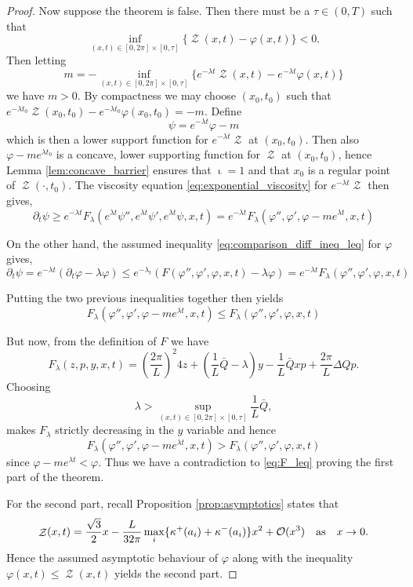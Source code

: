 \documentclass[11pt]{amsart}
\DeclareMathOperator{\chordarcprofile}{\mathcal{Z}}
\DeclareMathOperator{\tangindicator}{\iota}
\begin{document}
\begin{proof}
Now suppose the theorem is false. Then there must be a $\tau \in (0, T)$ such that
\[
\inf_{(x, t) \in [0, 2\pi] \times [0,\tau]} \{\chordarcprofile(x, t) - \varphi(x, t)\}  < 0.
\]
Then letting
\[
m = -\inf_{(x, t) \in [0, 2\pi] \times [0,\tau]} \{e^{-\lambda t} \chordarcprofile(x, t) - e^{-\lambda t} \varphi(x, t)\}
\]
we have $m > 0$. By compactness we may choose $(x_0, t_0)$ such that $e^{-\lambda t_0} \chordarcprofile(x_0, t_0) - e^{-\lambda t_0} \varphi(x_0, t_0) = -m$. Define
\[
\psi = e^{-\lambda t} \varphi - m
\]
which is then a lower support function for $e^{-\lambda t} \chordarcprofile$ at $(x_0, t_0)$. Then also $\varphi - m e^{\lambda t_0}$ is a concave, lower supporting function for $\chordarcprofile$ at $(x_0, t_0)$, hence Lemma \ref{lem:concave_barrier} ensures that $\tangindicator = 1$ and that $x_0$ is a regular point of $\chordarcprofile(\cdot, t_0)$. The viscosity equation \eqref{eq:exponential_viscosity} for $e^{-\lambda t}\chordarcprofile$ then gives,
\[
\partial_t \psi \geq e^{-\lambda t} F_{\lambda} (e^{\lambda t} \psi'', e^{\lambda t} \psi', e^{\lambda t} \psi, x, t) = e^{-\lambda t} F_{\lambda} (\varphi'', \varphi', \varphi - m e^{\lambda t}, x, t)
\]

On the other hand, the assumed inequality \eqref{eq:comparison_diff_ineq_leq} for $\varphi$ gives,
\[
\partial_t \psi = e^{-\lambda t} (\partial_t \varphi - \lambda \varphi) \leq e^{-\lambda_t}(F(\varphi'', \varphi', \varphi, x, t)  - \lambda \varphi) = e^{-\lambda t} F_{\lambda}(\varphi'', \varphi', \varphi, x, t)
\]

Putting the two previous inequalities together then yields
\begin{equation}
\label{eq:F_leq}
F_{\lambda} (\varphi'', \varphi', \varphi - m e^{\lambda t}, x, t) \leq F_{\lambda}(\varphi'', \varphi', \varphi, x, t)
\end{equation}

But now, from the definition of $F$ we have
\[
F_{\lambda} (z, p, y, x, t) = \left(\frac{2\pi}{L}\right)^2 4 z + (\frac{1}{L} \bar{Q} - \lambda) y - \frac{1}{L} \bar{Q} x p + \frac{2\pi}{L} \Delta Q p.
\]
Choosing
\[
\lambda > \sup_{(x, t) \in [0, 2\pi] \times [0, \tau]} \frac{1}{L} \bar{Q},
\]
makes $F_{\lambda}$ strictly decreasing in the $y$ variable and hence
\[
F_{\lambda} (\varphi'', \varphi', \varphi - m e^{\lambda t}, x, t) > F_{\lambda}(\varphi'', \varphi', \varphi, x, t)
\]
since $\varphi - m e^{\lambda t} < \varphi$. Thus we have a contradiction to \eqref{eq:F_leq} proving the first part of the theorem.

For the second part, recall Proposition \ref{prop:asymptotics} states that
\[
\chordarcprofile(x, t) = \frac{\sqrt{3}}{2}x - \frac{L}{32\pi} \max_i \{\curvecurv^+(a_i) + \curvecurv^-(a_i)\} x^2 + \bigo(x^3) \quad \text{as} \quad x \to 0.
\]
Hence the assumed asymptotic behaviour of $\varphi$ along with the inequality $\varphi(x, t) \leq \chordarcprofile(x, t)$ yields the second part.
\end{proof}
\end{document}
